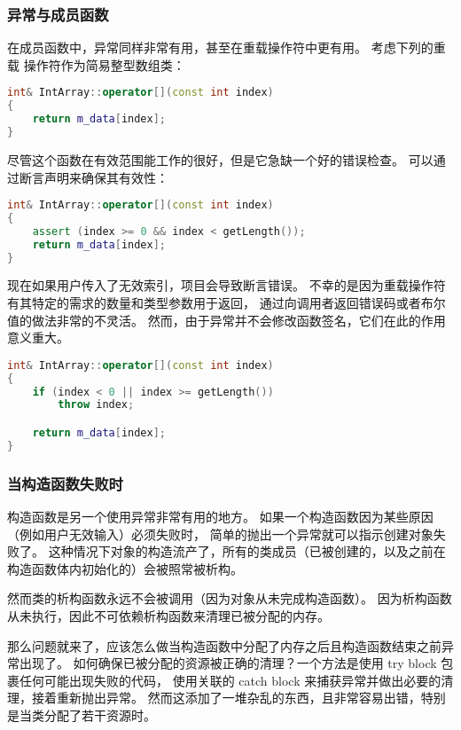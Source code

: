 \documentclass[../../LearnCpp.tex]{subfiles}
\begin{document}

\subsubsection*{异常与成员函数}

在成员函数中，异常同样非常有用，甚至在重载操作符中更有用。
考虑下列的重载 \acode{[]} 操作符作为简易整型数组类：

\begin{lstlisting}[language=C++]
int& IntArray::operator[](const int index)
{
    return m_data[index];
}
\end{lstlisting}

尽管这个函数在有效范围能工作的很好，但是它急缺一个好的错误检查。
可以通过断言声明来确保其有效性：

\begin{lstlisting}[language=C++]
int& IntArray::operator[](const int index)
{
    assert (index >= 0 && index < getLength());
    return m_data[index];
}
\end{lstlisting}

现在如果用户传入了无效索引，项目会导致断言错误。
不幸的是因为重载操作符有其特定的需求的数量和类型参数用于返回，
通过向调用者返回错误码或者布尔值的做法非常的不灵活。
然而，由于异常并不会修改函数签名，它们在此的作用意义重大。

\begin{lstlisting}[language=C++]
int& IntArray::operator[](const int index)
{
    if (index < 0 || index >= getLength())
        throw index;

    return m_data[index];
}
\end{lstlisting}

\subsubsection*{当构造函数失败时}

构造函数是另一个使用异常非常有用的地方。
如果一个构造函数因为某些原因（例如用户无效输入）必须失败时，
简单的抛出一个异常就可以指示创建对象失败了。
这种情况下对象的构造流产了，所有的类成员（已被创建的，以及之前在构造函数体内初始化的）会被照常被析构。

然而类的析构函数永远不会被调用（因为对象从未完成构造函数）。
因为析构函数从未执行，因此不可依赖析构函数来清理已被分配的内存。

那么问题就来了，应该怎么做当构造函数中分配了内存之后且构造函数结束之前异常出现了。
如何确保已被分配的资源被正确的清理？一个方法是使用 try block 包裹任何可能出现失败的代码，
使用关联的 catch block 来捕获异常并做出必要的清理，接着重新抛出异常。
然而这添加了一堆杂乱的东西，且非常容易出错，特别是当类分配了若干资源时。
\end{document}
